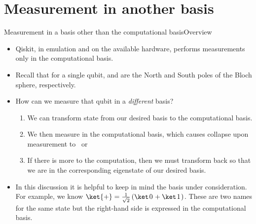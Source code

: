 \section*{Measurement in another basis}

\begin{frame}{Measurement in a basis other than the computational basis}{Overview}

\begin{itemize}[<+->]
    \item Qiskit, in emulation and on the available hardware, performs measurements only in the computational basis.
    \item Recall that for a single qubit, \QZero{} and \QOne{} are the North and South poles of the Bloch sphere, respectively.
    \item How can we measure that qubit in a \emph{different} basis?
    \begin{enumerate}
    \item We can transform state from our desired basis to the computational basis.
    \item We then measure in the computational basis, which causes collapse upon measurement to~\QZero{} or~\QOne{}
    \item If there is more to the computation, then we must transform back so that we are in the corresponding eigenstate of our desired basis.
    \end{enumerate}
    \item In this discussion it is helpful to keep in mind the basis under consideration.  For example, we know
    \(\ket{+} = \QPlus \).  These are two names for the same state but the right-hand side is expressed in the computational basis.
\end{itemize}
    
\end{frame}

